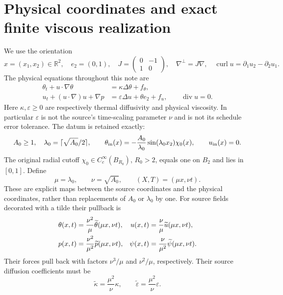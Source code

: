 \section{Physical coordinates and exact finite viscous realization}
\label{cvlane:sec:physical}
We use the orientation
\[
 x=(x_1,x_2)\in\mathbb R^2,\quad e_2=(0,1),\quad
 J=\begin{pmatrix}0&-1\\1&0\end{pmatrix},\quad
 \nabla^\perp=J\nabla,\quad \operatorname{curl}u=\partial_1u_2-\partial_2u_1.
\]
The physical equations throughout this note are
\begin{align}
 \theta_t+u\cdot\nabla\theta&=\kappa\Delta\theta+f_\theta,
 \label{cvlane:eq:physicaltheta}\\
 u_t+(u\cdot\nabla)u+\nabla p&=\varepsilon\Delta u+\theta e_2+f_u,
 \qquad \operatorname{div}u=0.\label{cvlane:eq:physicalu}
\end{align}
Here $\kappa,\varepsilon\geq0$ are respectively thermal diffusivity and
physical viscosity. In particular $\varepsilon$ is not the source's
time-scaling parameter $\nu$ and is not its schedule error tolerance.
The datum is retained exactly:
\[
 A_0\geq1,\quad \lambda_0=\lceil\sqrt{A_0}/2\rceil,
 \qquad \theta_{\rm in}(x)=-\frac{A_0}{\lambda_0}
 \sin(\lambda_0x_2)\chi_0(x),\qquad u_{\rm in}(x)=0.
\]
The original radial cutoff $\chi_0\in C_c^\infty(B_{R_0})$, $R_0>2$,
equals one on $B_2$ and lies in $[0,1]$. Define
\[
 \mu=\lambda_0,\qquad \nu=\sqrt{A_0},\qquad (X,T)=(\mu x,\nu t).
\]
These are explicit maps between the source coordinates and the physical
coordinates, rather than replacements of $A_0$ or $\lambda_0$ by one.
For source fields decorated with a tilde their pullback is
\begin{align}
 \theta(x,t)&=\frac{\nu^2}{\mu}\widetilde\theta(\mu x,\nu t),&
 u(x,t)&=\frac\nu\mu\widetilde u(\mu x,\nu t),\notag\\
 p(x,t)&=\frac{\nu^2}{\mu^2}\widetilde p(\mu x,\nu t),&
 \psi(x,t)&=\frac\nu{\mu^2}\widetilde\psi(\mu x,\nu t).
 \label{cvlane:eq:physicalmap}
\end{align}
Their forces pull back with factors $\nu^3/\mu$ and $\nu^2/\mu$,
respectively. Their source diffusion coefficients must be
\begin{equation}
 \widetilde\kappa=\frac{\mu^2}{\nu}\kappa,
 \qquad \widetilde\varepsilon=\frac{\mu^2}{\nu}\varepsilon.
 \label{cvlane:eq:viscscale}
\end{equation}
